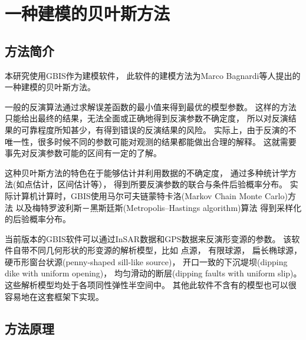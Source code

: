 \chapter{一种建模的贝叶斯方法}
\label{ch:pm}
\section{方法简介}
本研究使用GBIS\cite{bagnardiInversionSurfaceDeformation2018}作为建模软件，
此软件的建模方法为Marco Bagnardi等人提出的一种建模的贝叶斯方法。

一般的反演算法通过求解误差函数的最小值来得到最优的模型参数。
这样的方法只能给出最终的结果，无法全面或正确地得到反演参数不确定度，
所以对反演结果的可靠程度所知甚少，有得到错误的反演结果的风险。
实际上，由于反演的不唯一性，很多时候不同的参数可能对观测的结果都能做出合理的解释。
这就需要事先对反演参数可能的区间有一定的了解。

这种贝叶斯方法的特色在于能够估计并利用数据的不确定度，
通过多种统计学方法(如点估计，区间估计等），
得到所要反演参数的联合与条件后验概率分布。
实际计算机计算时，GBIS使用马尔可夫链蒙特卡洛(Markov Chain Monte Carlo)方法
以及梅特罗波利斯－黑斯廷斯(Metropolis–Hastings algorithm)算法
\cite{hastingsMonteCarloSampling1970,mosegaardMonteCarloSampling1995}
得到采样化的后验概率分布。

当前版本的GBIS软件可以通过InSAR数据和GPS数据来反演形变源的参数。
该软件自带不同几何形状的形变源的解析模型，比如
点源\cite{mogiRelationsEruptionsVarious1958}，
有限球源\cite{mctigueElasticStressDeformation1987}，
扁长椭球源\cite{yangDeformationInflationDipping1988}，
硬币形窗台状源(penny-shaped sill-like source)\cite{fialkoDeformationDuePressurized2001}，
开口一致的下沉堤坝(dipping dike with uniform opening)\cite{okadaSurfaceDeformationDue1985}，
均匀滑动的断层(dipping faults with uniform slip)\cite{okadaSurfaceDeformationDue1985}。
这些解析模型均处于各项同性弹性半空间中。
其他此软件不含有的模型也可以很容易地在这套框架下实现。

\section{方法原理}

